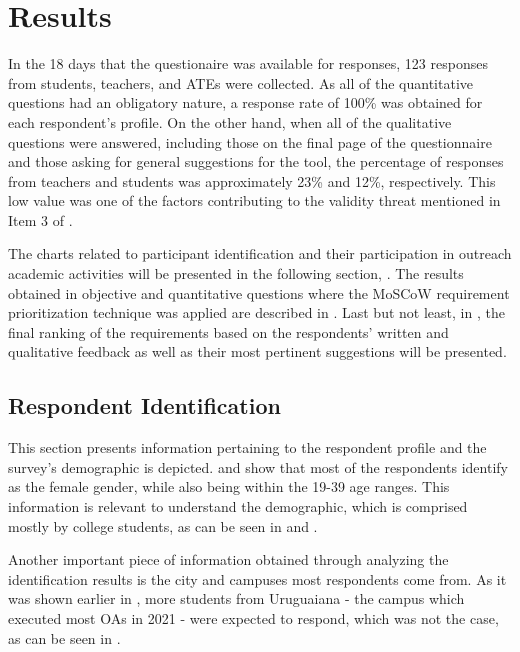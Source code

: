 \section{Results}\label{sec:survey-results}

In the 18 days that the questionaire was available for responses, 123 responses from students, teachers, and \acp{ATE} were collected. As all of the quantitative questions had an obligatory nature, a response rate of 100\% was obtained for each respondent's profile. On the other hand, when all of the qualitative questions were answered, including those on the final page of the questionnaire and those asking for general suggestions for the tool, the percentage of responses from teachers and students was approximately 23\% and 12\%, respectively. This low value was one of the factors contributing to the validity threat mentioned in Item 3 of .

The charts related to participant identification and their participation in outreach academic activities will be presented in the following section, . The results obtained in objective and quantitative questions where the \ac{MoSCoW} requirement prioritization technique was applied are described in . Last but not least, in , the final ranking of the requirements based on the respondents' written and qualitative feedback as well as their most pertinent suggestions will be presented.


\subsection{Respondent Identification}\label{sec:survey-participant-id}

This section presents information pertaining to the respondent profile and the survey's demographic is depicted.  and  show that most of the respondents identify as the female gender, while also being within the 19-39 age ranges. This information is relevant to understand the demographic, which is comprised mostly by college students, as can be seen in  and .

Another important piece of information obtained through analyzing the identification results is the city and campuses most respondents come from. As it was shown earlier in , more students from Uruguaiana - the campus which executed most \aclp{OA} in 2021 - were expected to respond, which was not the case, as can be seen in .

